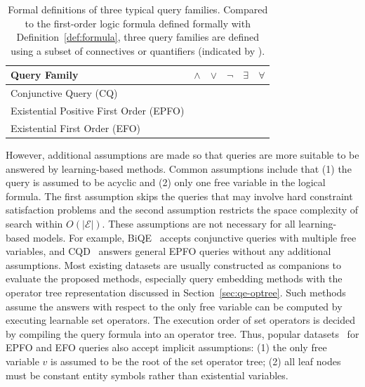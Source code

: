 \documentclass[11pt]{article}
\newcommand{\cmark}{\ding{51}}
\newcommand{\xmark}{\ding{55}}
\newcommand{\entity}{\mathcal{E}}
\begin{document}
\begin{table}[t]
	\centering
	\caption{Formal definitions of three typical query families. Compared to the first-order logic formula defined formally with Definition~\ref{def:formula}, three query families are defined using a subset of connectives or quantifiers (indicated by \cmark).}\label{tab:query-families}
	\begin{tabular}{lccccc}
		\toprule
		Query Family & $\land$ & $\lor$ & $\lnot$ & $\exists$ & $\forall$ \\\midrule
		Conjunctive Query (CQ) & \cmark & \xmark & \xmark & \cmark & \xmark \\
		Existential Positive First Order (EPFO) & \cmark & \cmark & \xmark & \cmark & \xmark \\
		Existential First Order (EFO) & \cmark & \cmark & \cmark & \cmark & \xmark \\
		\bottomrule
	\end{tabular}
\end{table}

However, additional assumptions are made so that queries are more suitable to be answered by learning-based methods. Common assumptions include that (1) the query is assumed to be acyclic and (2) only one free variable in the logical formula. The first assumption skips the queries that may involve hard constraint satisfaction problems and the second assumption restricts the space complexity of search within $O(|\entity|)$. These assumptions are not necessary for all learning-based models. For example, BiQE~\cite{Kotnis2021AnsweringComplex} accepts conjunctive queries with multiple free variables, and CQD~\cite{Arakelyan2021ComplexQuery} answers general EPFO queries without any additional assumptions.
Most existing datasets are usually constructed as companions to evaluate the proposed methods, especially query embedding methods with the operator tree representation discussed in Section~\ref{sec:qe-optree}. Such methods assume the answers with respect to the only free variable can be computed by executing learnable set operators. The execution order of set operators is decided by compiling the query formula into an operator tree.
Thus, popular datasets~\cite{Ren2020Query2boxReasoning,Ren2020BetaEmbeddings,Wang2021BenchmarkingCombinatorial} for EPFO and EFO queries also accept implicit assumptions:
(1) the only free variable $v$ is assumed to be the root of the set operator tree;
(2) all leaf nodes must be constant entity symbols rather than existential variables.
\end{document}
